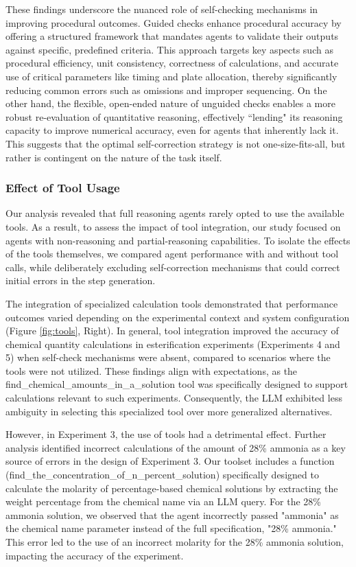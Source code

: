 \documentclass[sn-nature, twocolumn]{sn-jnl}%
\theoremstyle{thmstyleone}%
\theoremstyle{thmstyletwo}%
\theoremstyle{thmstylethree}%
\begin{document}
These findings underscore the nuanced role of self-checking mechanisms in improving procedural outcomes. Guided checks enhance procedural accuracy by offering a structured framework that mandates agents to validate their outputs against specific, predefined criteria. This approach targets key aspects such as procedural efficiency, unit consistency, correctness of calculations, and accurate use of critical parameters like timing and plate allocation, thereby significantly reducing common errors such as omissions and improper sequencing. On the other hand, the flexible, open-ended nature of unguided checks enables a more robust re-evaluation of quantitative reasoning, effectively ``lending" its reasoning capacity to improve numerical accuracy, even for agents that inherently lack it. This suggests that the optimal self-correction strategy is not one-size-fits-all, but rather is contingent on the nature of the task itself. 



\subsubsection{Effect of Tool Usage} 

Our analysis revealed that full reasoning agents rarely opted to use the available tools. As a result, to assess the impact of tool integration, our study focused on agents with non-reasoning and partial-reasoning capabilities. To isolate the effects of the tools themselves, we compared agent performance with and without tool calls, while deliberately excluding self-correction mechanisms that could correct initial errors in the step generation.

The integration of specialized calculation tools demonstrated that performance outcomes varied depending on the experimental context and system configuration (Figure \ref{fig:tools}, Right). In general, tool integration improved the accuracy of chemical quantity calculations in esterification experiments (Experiments 4 and 5) when self-check mechanisms were absent, compared to scenarios where the tools were not utilized. These findings align with expectations, as the find\_chemical\_amounts\_in\_a\_solution tool was specifically designed to support calculations relevant to such experiments. Consequently, the LLM exhibited less ambiguity in selecting this specialized tool over more generalized alternatives.

However, in Experiment 3, the use of tools had a detrimental effect. Further analysis identified incorrect calculations of the amount of 28\% ammonia as a key source of errors in the design of Experiment 3. Our toolset includes a function (find\_the\_concentration\_of\_n\_percent\_solution) specifically designed to calculate the molarity of percentage-based chemical solutions by extracting the weight percentage from the chemical name via an LLM query. For the 28\% ammonia solution, we observed that the agent incorrectly passed "ammonia" as the chemical name parameter instead of the full specification, "28\% ammonia." This error led to the use of an incorrect molarity for the 28\% ammonia solution, impacting the accuracy of the experiment.
\end{document}

